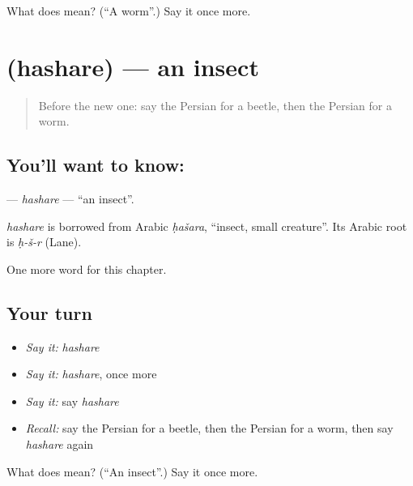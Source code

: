 \begin{tcolorbox}[breakable,colback=teal!4,colframe=teal!35!black,title={Before you move on}]
What does  mean? (\textquotedblleft{}A worm\textquotedblright{}.) Say it once more.
\end{tcolorbox}
\section[\texorpdfstring{\fa{حشره} (hashare)}{حشره (hashare)}]{ (hashare) — an insect}

\label{lesson:FA-C121-hashare}



\begin{quote}
Before the new one: say the Persian for a beetle, then the Persian for a worm.
\end{quote}

\subsection*{You'll want to know: }
\textbf{} — \emph{hashare} — \textquotedblleft{}an insect\textquotedblright{}.

\begin{cousinweb}
\emph{hashare} is borrowed from Arabic \emph{ḥašara}, \textquotedblleft{}insect, small creature\textquotedblright{}. Its Arabic root is \emph{ḥ-š-r} (Lane).
\end{cousinweb}

\begin{grammarlens}[title={What you've built}]
One more word for this chapter.
\end{grammarlens}

\subsection*{Your turn}
\begin{itemize}
\raggedright
  \item \emph{Say it:} \emph{hashare}
  \item \emph{Say it:} \emph{hashare}, once more
  \item \emph{Say it:} say \emph{hashare}
  \item \emph{Recall:} say the Persian for a beetle, then the Persian for a worm, then say \emph{hashare} again
\end{itemize}

\begin{tcolorbox}[breakable,colback=teal!4,colframe=teal!35!black,title={Before you move on}]
What does  mean? (\textquotedblleft{}An insect\textquotedblright{}.) Say it once more.
\end{tcolorbox}
